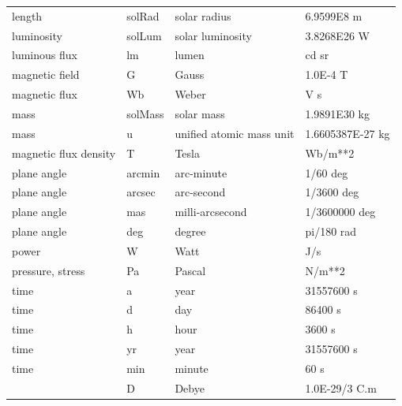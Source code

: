\documentclass[twoside,11pt]{starlink}
\begin{document}
\begin{table}[htbp]
\begin{center}
\begin{small}
\begin{tabular}{|l|l|l|l|}
length & solRad & solar radius & 6.9599E8 m \\
luminosity & solLum & solar luminosity & 3.8268E26 W \\
luminous flux & lm & lumen & cd sr \\
magnetic field & G & Gauss & 1.0E-4 T \\
magnetic flux & Wb & Weber & V s \\
mass & solMass & solar mass & 1.9891E30 kg \\
mass & u & unified atomic mass unit & 1.6605387E-27 kg \\
magnetic flux density & T & Tesla & Wb/m**2 \\
plane angle  & arcmin & arc-minute & 1/60 deg \\
plane angle  & arcsec & arc-second & 1/3600 deg \\
plane angle  & mas & milli-arcsecond & 1/3600000 deg \\
plane angle & deg & degree & pi/180 rad \\
power & W & Watt & J/s \\
pressure, stress & Pa & Pascal & N/m**2 \\
time  & a & year & 31557600 s \\
time  & d & day & 86400 s \\
time  & h & hour & 3600 s \\
time  & yr & year & 31557600 s \\
time  & min & minute & 60 s \\
      & D & Debye & 1.0E-29/3 C.m \\
\hline
\end{tabular}
\end{small}
\end{center}
\end{table}
\end{document}
